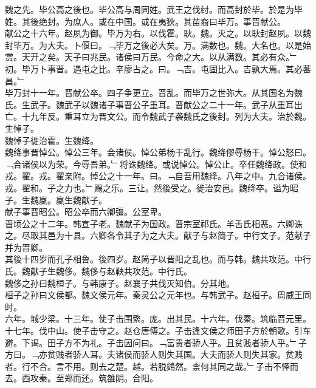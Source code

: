 \documentclass{zhvt-classic}
\begin{document}
\hspace*{2em}魏之先。毕公高之後也。毕公高与周同姓。武王之伐纣。而高封於毕。於是为毕姓。其後绝封。为庶人。或在中国。或在夷狄。其苗裔曰毕万。事晋献公。\\
\hspace*{2em}献公之十六年。赵夙为御。毕万为右。以伐霍。耿。魏。灭之。以耿封赵夙。以魏封毕万。为大夫。卜偃曰。﹁毕万之後必大矣。万。满数也。魏。大名也。以是始赏。天开之矣。天子曰兆民。诸侯曰万民。今命之大。以从满数。其必有众。﹂初。毕万卜事晋。遇屯之比。辛廖占之。曰。﹁吉。屯固比入。吉孰大焉。其必蕃昌。﹂\\
\hspace*{2em}毕万封十一年。晋献公卒。四子争更立。晋乱。而毕万之世弥大。从其国名为魏氏。生武子。魏武子以魏诸子事晋公子重耳。晋献公之二十一年。武子从重耳出亡。十九年反。重耳立为晋文公。而令魏武子袭魏氏之後封。列为大夫。治於魏。生悼子。\\
\hspace*{2em}魏悼子徙治霍。生魏绛。\\
\hspace*{2em}魏绛事晋悼公。悼公三年。会诸侯。悼公弟杨干乱行。魏绛僇辱杨干。悼公怒曰。﹁合诸侯以为荣。今辱吾弟。﹂将诛魏绛。或说悼公。悼公止。卒任魏绛政。使和戎。翟。戎。翟亲附。悼公之十一年。曰。﹁自吾用魏绛。八年之中。九合诸侯。戎。翟和。子之力也。﹂赐之乐。三让。然後受之。徙治安邑。魏绛卒。谥为昭子。生魏嬴。嬴生魏献子。\\
\hspace*{2em}献子事晋昭公。昭公卒而六卿彊。公室卑。\\
\hspace*{2em}晋顷公之十二年。韩宣子老。魏献子为国政。晋宗室祁氏。羊舌氏相恶。六卿诛之。尽取其邑为十县。六卿各令其子为之大夫。献子与赵简子。中行文子。范献子并为晋卿。\\
\hspace*{2em}其後十四岁而孔子相鲁。後四岁。赵简子以晋阳之乱也。而与韩。魏共攻范。中行氏。魏献子生魏侈。魏侈与赵鞅共攻范。中行氏。\\
\hspace*{2em}魏侈之孙曰魏桓子。与韩康子。赵襄子共伐灭知伯。分其地。\\
\hspace*{2em}桓子之孙曰文侯都。魏文侯元年。秦灵公之元年也。与韩武子。赵桓子。周威王同时。\\
\hspace*{2em}六年。城少梁。十三年。使子击围繁。庞。出其民。十六年。伐秦。筑临晋元里。\\
\hspace*{2em}十七年。伐中山。使子击守之。赵仓唐傅之。子击逢文侯之师田子方於朝歌。引车避。下谒。田子方不为礼。子击因问曰。﹁富贵者骄人乎。且贫贱者骄人乎。﹂子方曰。﹁亦贫贱者骄人耳。夫诸侯而骄人则失其国。大夫而骄人则失其家。贫贱者。行不合。言不用。则去之楚。越。若脱鵕然。柰何其同之哉。﹂子击不怿而去。西攻秦。至郑而还。筑雒阴。合阳。\\
\end{document}
